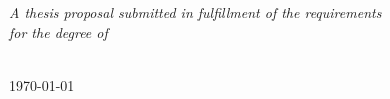 \documentclass[
11pt, %
oneside, %
english, %
singlespacing, %
liststotoc, %
headsepline, %
]{MastersDoctoralThesis} %
\begin{document}
\begin{titlepage}
\begin{center}
      

\vfill

\large \textit{A thesis proposal submitted in fulfillment of the requirements \\for the degree of \degreename}\\[0.7cm] 

\deptname\\[2cm] %
 
\vfill

{\large \today}\\[4cm] %
 
\vfill
\end{center}
\end{titlepage}



 
\end{document}

